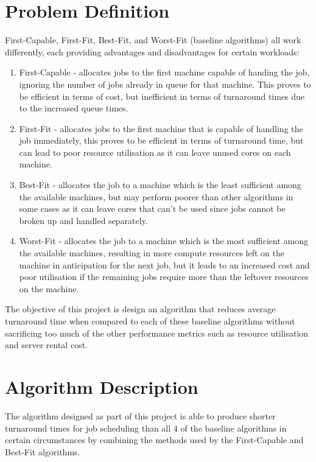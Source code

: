 \documentclass[a4paper]{article}
\begin{document}
\section{Problem Definition}
\label{sec:section2}
First-Capable, First-Fit, Best-Fit, and Worst-Fit (baseline algorithms) all work differently, each providing advantages and disadvantages for certain workloads:
\begin{enumerate}
  \item First-Capable - allocates jobs to the first machine capable of handing the job, ignoring the number of jobs already in queue for that machine. This proves to be efficient in terms of cost, but inefficient in terms of turnaround times due to the increased queue times.
  \item First-Fit - allocates jobs to the first machine that is capable of handling the job immediately, this proves to be efficient in terms of turnaround time, but can lead to poor resource utilisation as it can leave unused cores on each machine. 
  \item Best-Fit - allocates the job to a machine which is the least sufficient among the available machines, but may perform poorer than other algorithms in some cases as it can leave cores that can't be used since jobs cannot be broken up and handled separately.
  \item Worst-Fit - allocates the job to a machine which is the most sufficient among the available machines, resulting in more compute resources left on the machine in anticipation for the next job, but it leads to an increased cost and poor utilisation if the remaining jobs require more than the leftover resources on the machine.
\end{enumerate}

The objective of this project is design an algorithm that reduces average turnaround time when compared to each of these baseline algorithms without sacrificing too much of the other performance metrics such as resource utilisation and server rental cost.

\section{Algorithm Description}
\label{sec:section3}
The algorithm designed as part of this project is able to produce shorter turnaround times for job scheduling than all 4 of the baseline algorithms in certain circumstances by combining the methods used by the First-Capable and Best-Fit algorithms.
\end{document}
